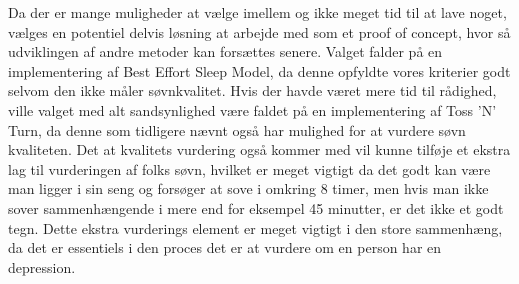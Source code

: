 Da der er mange muligheder at vælge imellem og ikke meget tid til at lave noget, vælges en potentiel delvis løsning at arbejde med som et proof of concept, hvor så udviklingen af andre metoder kan forsættes senere.
Valget falder på en implementering af Best Effort Sleep Model, da denne opfyldte vores kriterier godt selvom den ikke måler søvnkvalitet.
Hvis der havde været mere tid til rådighed, ville valget med alt sandsynlighed være faldet på en implementering af Toss 'N' Turn, da denne som tidligere nævnt også har mulighed for at vurdere søvn kvaliteten.
Det at kvalitets vurdering også kommer med vil kunne tilføje et ekstra lag til vurderingen af folks søvn, hvilket er meget vigtigt da det godt kan være man ligger i sin seng og forsøger at sove i omkring 8 timer, men hvis man ikke sover sammenhængende i mere end for eksempel 45 minutter, er det ikke et godt tegn.
Dette ekstra vurderings element er meget vigtigt i den store sammenhæng, da det er essentiels i den proces det er at vurdere om en person har en depression. 

